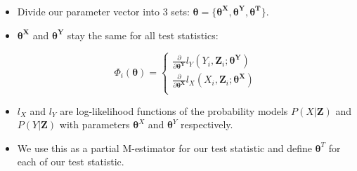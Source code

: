 \documentclass{beamer}
\begin{document}
\begin{frame}
	\frametitle{}
	\begin{itemize}
		\item Divide our parameter vector into $ 3 $ sets: $ \bm{\theta} = \{ \bm{\theta^\bm{X}}, \bm{\theta^\bm{Y}}, \bm{\theta^\bm{T}} \} $.
		\item $ \bm{\theta^\bm{X}} $ and $ \bm{\theta^\bm{Y}} $ stay the same for all test
			statistics:

			\begin{equation*}
			\Phi_i(\bm{\theta}) = \begin{cases}
				\frac{\partial}{\partial \bm{\theta}^{\bm{Y}}} l_Y (Y_i, \bm{Z}_i; \bm{\theta^{Y}}) \\
				\frac{\partial}{\partial \bm{\theta}^{\bm{X}}} l_X (X_i, \bm{Z}_i; \bm{\theta^{X}}) \\
				\end{cases}
			\end{equation*}

		\item $ l_X $ and $ l_Y $ are log-likelihood functions of the probability models $ P(X | \bm{Z}) $ and $ P(Y | \bm{Z}) $ with parameters $ \bm{\theta}^X $ and $ \bm{\theta}^Y $ respectively.
		\item We use this as a partial M-estimator for our test statistic and define $ \bm{\theta}^T $ for each of our test statistic.
	\end{itemize}
\end{frame}
\end{document}
